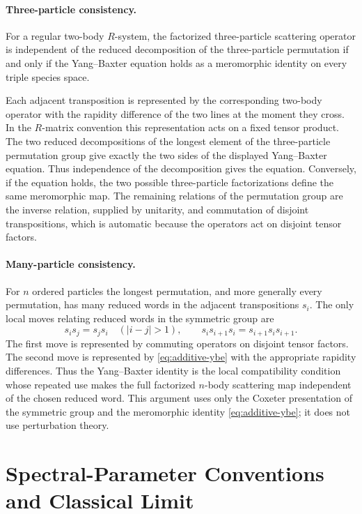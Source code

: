 \paragraph{Three-particle consistency.}
For a regular two-body \(R\)-system, the factorized three-particle scattering
operator is independent of the reduced decomposition of the three-particle
permutation if and only if the Yang--Baxter equation holds as a meromorphic
identity on every triple species space.

Each adjacent transposition is represented by the corresponding two-body
operator with the rapidity difference of the two lines at the moment they
cross.  In the \(R\)-matrix convention this representation acts on a fixed
tensor product.  The two reduced decompositions of the longest element of the
three-particle permutation group give exactly the two sides of the displayed
Yang--Baxter equation.  Thus independence of the decomposition gives the
equation.  Conversely, if the equation holds, the two possible three-particle
factorizations define the same meromorphic map.  The remaining relations of
the permutation group are the inverse relation, supplied by unitarity, and
commutation of disjoint transpositions, which is automatic because the
operators act on disjoint tensor factors.

\paragraph{Many-particle consistency.}
For \(n\) ordered particles the longest permutation, and more generally every
permutation, has many reduced words in the adjacent transpositions \(s_i\).
The only local moves relating reduced words in the symmetric group are
\[
  s_i s_j=s_j s_i\quad (|i-j|>1),
  \qquad
  s_i s_{i+1}s_i=s_{i+1}s_i s_{i+1}.
\]
The first move is represented by commuting operators on disjoint tensor
factors.  The second move is represented by
\eqref{eq:additive-ybe} with the appropriate rapidity differences.  Thus the
Yang--Baxter identity is the local compatibility condition whose repeated use
makes the full factorized \(n\)-body scattering map independent of the chosen
reduced word.  This argument uses only the Coxeter presentation of the
symmetric group and the meromorphic identity \eqref{eq:additive-ybe}; it does
not use perturbation theory.

\section{Spectral-Parameter Conventions and Classical Limit}

